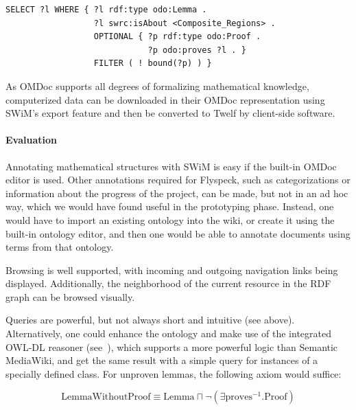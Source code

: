 \begin{lstlisting}
SELECT ?l WHERE { ?l rdf:type odo:Lemma .
                  ?l swrc:isAbout <Composite_Regions> .
                  OPTIONAL { ?p rdf:type odo:Proof .
                             ?p odo:proves ?l . }
                  FILTER ( ! bound(?p) ) }
\end{lstlisting}

As OMDoc supports all degrees of formalizing mathematical knowledge,
computerized data can be downloaded in their OMDoc representation using SWiM's
export feature and then be converted to Twelf by client-side
software\cite[chap.\ 25.2]{Kohlhase:omdoc1.2}.

\paragraph{Evaluation} Annotating mathematical structures with SWiM is easy if
the built-in OMDoc editor is used.  Other annotations required for Flyspeck,
such as categorizations or information about the progress of the project, can be
made, but not in an ad hoc way, which we would have found useful in the
prototyping phase.  Instead, one would have to import an existing ontology into
the wiki, or create it using the built-in ontology editor, and then one would be
able to annotate documents using terms from that ontology.

Browsing is well supported, with incoming and outgoing navigation links being
displayed.  Additionally, the neighborhood of the current resource in the RDF
graph can be browsed visually.

Queries are powerful, but not always short and intuitive (see above).
Alternatively, one could enhance the ontology and make use of the integrated
 OWL-DL reasoner (see~\cite{KrSchVr:semwiki-reasoning07}), which
supports a more powerful logic than Semantic MediaWiki, and get the same result
with a simple query for instances of a specially defined class.  For unproven
lemmas, the following axiom would suffice:

\[
\mbox{LemmaWithoutProof}\equiv\mbox{Lemma}\sqcap\neg(\exists\mbox{proves}^{-1}.\mbox{Proof})
\]

